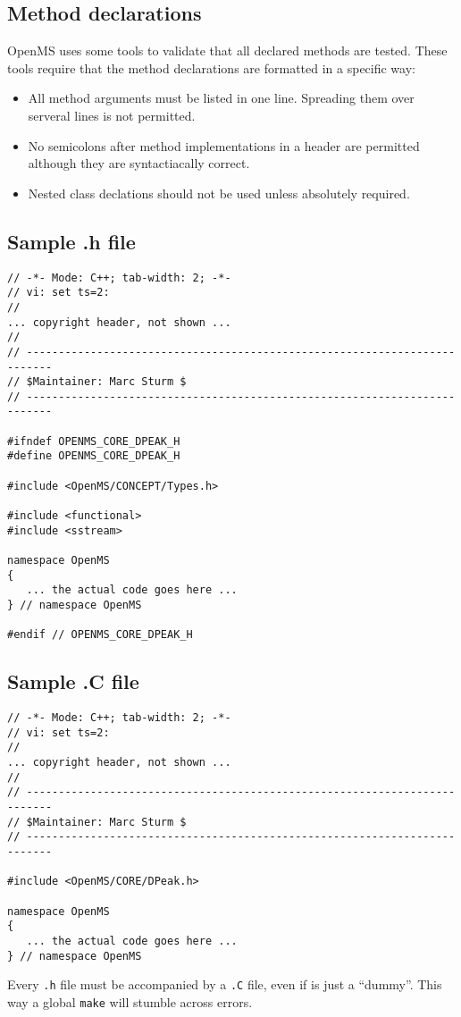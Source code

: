 \documentclass[a4]{article}
\begin{document}
\subsection{Method declarations}
OpenMS uses some tools to validate that all declared methods are tested.
These tools require that the method declarations are formatted in a specific 
way:
\begin{itemize}
	\item All method arguments must be listed in one line. Spreading them over serveral lines is not permitted.
	\item No semicolons after method implementations in a header are permitted although they are syntactiacally correct.
	\item Nested class declations should not be used unless absolutely required.
\end{itemize}

\subsection{Sample .h file}

\begin{footnotesize}
\begin{verbatim}
// -*- Mode: C++; tab-width: 2; -*-
// vi: set ts=2:
//
... copyright header, not shown ...
//
// --------------------------------------------------------------------------
// $Maintainer: Marc Sturm $
// --------------------------------------------------------------------------

#ifndef OPENMS_CORE_DPEAK_H
#define OPENMS_CORE_DPEAK_H

#include <OpenMS/CONCEPT/Types.h>

#include <functional>
#include <sstream>

namespace OpenMS
{
   ... the actual code goes here ...
} // namespace OpenMS

#endif // OPENMS_CORE_DPEAK_H
\end{verbatim}
\end{footnotesize}

\subsection{Sample .C file}

\begin{footnotesize}
\begin{verbatim}
// -*- Mode: C++; tab-width: 2; -*-
// vi: set ts=2:
//
... copyright header, not shown ...
//
// --------------------------------------------------------------------------
// $Maintainer: Marc Sturm $
// --------------------------------------------------------------------------

#include <OpenMS/CORE/DPeak.h>

namespace OpenMS
{
   ... the actual code goes here ...
} // namespace OpenMS

\end{verbatim}
\end{footnotesize}
Every \texttt{.h} file must be accompanied by a \texttt{.C} file, even if is
just a ``dummy''.  This way a global \texttt{make} will
stumble across errors.
\end{document}
